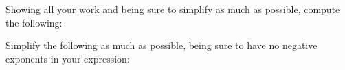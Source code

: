 \documentclass[12pt,letterpaper]{exam}
\begin{document}
\begin{questions}





\newpage
\question[8] Showing all your work and being sure to simplify as much as possible, compute the following: \pspace
{}





\newpage
\question[8] Simplify the following as much as possible, being sure to have no negative exponents in your expression: \pspace
{}
\end{questions}
\end{document}
